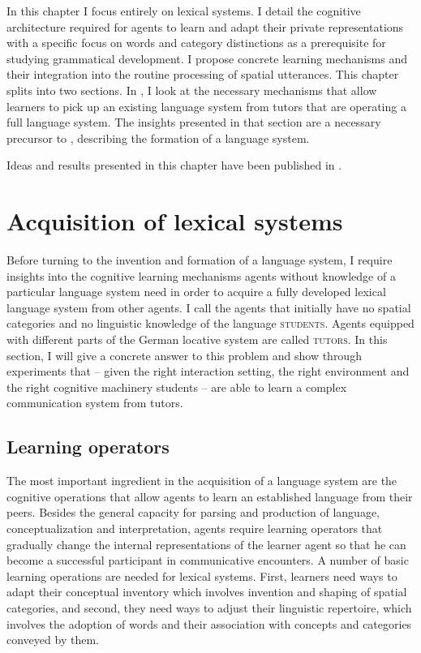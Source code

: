 In this chapter I focus entirely on lexical systems. 
I detail the cognitive architecture required for agents to learn 
and adapt their private representations with a specific
focus on words and category distinctions as a prerequisite 
for studying grammatical development. I propose concrete 
learning mechanisms and their integration into the
routine processing of spatial utterances. This chapter splits into 
two sections. In , I look at the necessary mechanisms that allow 
learners to pick up an existing language system from tutors that 
are operating a full language system. The insights presented in 
that section are a necessary precursor to ,
describing the formation of a language system. 

Ideas and results presented in this chapter have been 
published in \citealt{spranger2012basic,spranger2013acquisition}.

\section{Acquisition of lexical systems}
\label{s:category-acquisition}
Before turning to the invention and formation of a language system, I require
insights into the cognitive learning mechanisms agents without knowledge 
of a particular language system need in order to acquire a fully developed lexical language
system from other agents. I call the agents that initially have no spatial categories
and no linguistic knowledge of the language \textsc{students}. Agents
equipped with different parts of the German locative system are called \textsc{tutors}.
In this section, I will give a concrete answer to this 
problem and show through experiments that -- given the right interaction setting,
the right environment and the right cognitive machinery students -- are able to learn 
a complex communication system from tutors.

\subsection{Learning operators}
The most important ingredient in the acquisition of a language system are
the cognitive operations that allow agents to learn an established language
from their peers. Besides the general capacity for parsing and production 
of language, conceptualization and interpretation, 
agents require learning operators that gradually change
the internal representations of the learner agent so that he can become a 
successful participant in communicative encounters. A number of basic learning
operations are needed for lexical systems. First, learners need ways to adapt
their conceptual inventory which involves invention and shaping of spatial categories, 
and second, they need ways to adjust their linguistic repertoire, which involves 
the adoption of words and their association with concepts and categories 
conveyed by them. 

